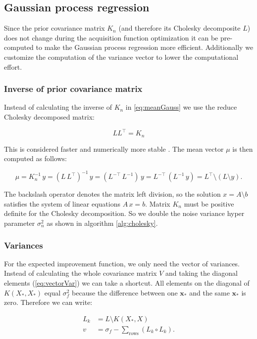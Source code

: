 \subsection{Gaussian process regression}

Since the prior covariance matrix $K_n$ (and therefore its Cholesky decomposite $L$) does not change during the acquisition function optimization it can be pre-computed to make the Gaussian process regression more efficient. Additionally we customize the computation of the variance vector to lower the computational effort.

\subsubsection{Inverse of prior covariance matrix}

Instead of calculating the inverse of $K_n$ in \eqref{eq:meanGauss} we use the reduce Cholesky decomposed matrix:

$$LL^\top=K_n$$

This is considered faster and numerically more stable \cite{rasmussen2006gaussian}. The mean vector $\mu$ is then computed as follows:

\begin{equation} \label{eq:regression}
    \mu = K_n^{-1}\,y = (L\,L^{\top})^{-1}\,y = (L^{-\top}\,L^{-1})\,y = L^{-\top}\,(L^{-1}\,y) = L^{\top}\setminus(L \setminus y).
\end{equation}

The backslash operator denotes the matrix left division, so the solution $x=A\setminus b$ satisfies the system of linear equations $A\,x=b$.
Matrix $K_n$ must be positive definite for the Cholesky decomposition. So we double the noise variance hyper parameter $\sigma_n^2$ as shown in algorithm \ref{alg:cholesky}.

\subsubsection{Variances}

For the expected improvement function, we only need the vector of variances. Instead of calculating the whole covariance matrix $V$ and taking the diagonal elements (\ref{eq:vectorVar}) we can take a shortcut. All elements on the diagonal of $K(X_*,X_*)$ equal $\sigma_f^2$ because the difference between one $\mathbf{x}_*$ and the same $\mathbf{x}_*$ is zero. Therefore we can write:

\begin{align}
    L_k &= L \setminus K(X_*,X) \\
    v &= \sigma_f - \sum_{\text{rows}} (L_k \circ L_k). \label{eq:vectorvar}
\end{align}

